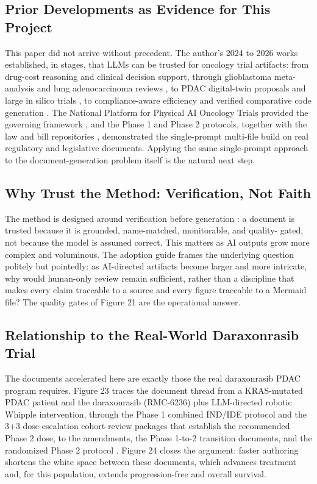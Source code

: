 \subsection{Prior Developments as Evidence for This Project}

This paper did not arrive without precedent. The author's 2024 to 2026 works
established, in stages, that LLMs can be trusted for oncology trial artifacts: from
drug-cost reasoning and clinical decision support, through glioblastoma meta-analysis
and lung adenocarcinoma reviews \cite{gbmmeta10yr, lungadeno}, to PDAC digital-twin
proposals and large in silico trials \cite{kawchak_2025_15735068,
kawchak_2025_16415815, kawchak_2025_17001137}, to compliance-aware efficiency and
verified comparative code generation \cite{e2eoncoeff, codegen16}. The National
Platform for Physical AI Oncology Trials provided the governing framework
\cite{natplatform}, and the Phase 1 \cite{phase1protocol} and Phase 2
\cite{phase2protocol} protocols, together with the law and bill repositories
\cite{lawnarrative, adoptionguide, lawenactment, hr9510v5, bill01v4}, demonstrated
the single-prompt multi-file build on real regulatory and legislative documents.
Applying the same single-prompt approach to the document-generation problem itself is
the natural next step.

\subsection{Why Trust the Method: Verification, Not Faith}

The method is designed around verification before generation \cite{hr9510v5}: a
document is trusted because it is grounded, name-matched, monitorable, and quality-
gated, not because the model is assumed correct. This matters as AI outputs grow more
complex and voluminous. The adoption guide frames the underlying question politely
but pointedly: as AI-directed artifacts become larger and more intricate, why would
human-only review remain sufficient, rather than a discipline that makes every claim
traceable to a source and every figure traceable to a Mermaid file? The quality
gates of Figure 21 are the operational answer.

\subsection{Relationship to the Real-World Daraxonrasib Trial}

The documents accelerated here are exactly those the real daraxonrasib PDAC program
requires. Figure 23 traces the document thread from a KRAS-mutated PDAC patient and
the daraxonrasib (RMC-6236) plus LLM-directed robotic Whipple intervention, through
the Phase 1 combined IND/IDE protocol \cite{phase1protocol} and the 3+3
dose-escalation cohort-review packages that establish the recommended Phase 2 dose,
to the amendments, the Phase 1-to-2 transition documents, and the randomized Phase 2
protocol \cite{phase2protocol, kawchak_2026_20196639}. Figure 24 closes the argument:
faster authoring shortens the white space between these documents, which advances
treatment and, for this population, extends progression-free and overall survival.


